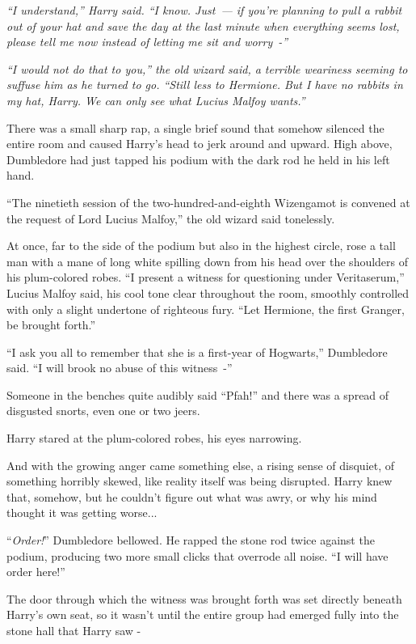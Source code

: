 \emph{``I understand,'' Harry said. ``I know. Just~--- if you're planning to pull a rabbit out of your hat and save the day at the last minute when everything seems lost, please tell me now instead of letting me sit and worry~-''}

\emph{``I would not do that to you,'' the old wizard said, a terrible weariness seeming to suffuse him as he turned to go. ``Still less to Hermione. But I have no rabbits in my hat, Harry. We can only see what Lucius Malfoy wants.''}

There was a small sharp rap, a single brief sound that somehow silenced the entire room and caused Harry's head to jerk around and upward. High above, Dumbledore had just tapped his podium with the dark rod he held in his left hand.

``The ninetieth session of the two-hundred-and-eighth Wizengamot is convened at the request of Lord Lucius Malfoy,'' the old wizard said tonelessly.

At once, far to the side of the podium but also in the highest circle, rose a tall man with a mane of long white spilling down from his head over the shoulders of his plum-colored robes. ``I present a witness for questioning under Veritaserum,'' Lucius Malfoy said, his cool tone clear throughout the room, smoothly controlled with only a slight undertone of righteous fury. ``Let Hermione, the first Granger, be brought forth.''

``I ask you all to remember that she is a first-year of Hogwarts,'' Dumbledore said. ``I will brook no abuse of this witness~-''

Someone in the benches quite audibly said ``Pfah!'' and there was a spread of disgusted snorts, even one or two jeers.

Harry stared at the plum-colored robes, his eyes narrowing.

And with the growing anger came something else, a rising sense of disquiet, of something horribly skewed, like reality itself was being disrupted. Harry knew that, somehow, but he couldn't figure out what was awry, or why his mind thought it was getting worse...

``\emph{Order!}'' Dumbledore bellowed. He rapped the stone rod twice against the podium, producing two more small clicks that overrode all noise. ``I will have order here!''

The door through which the witness was brought forth was set directly beneath Harry's own seat, so it wasn't until the entire group had emerged fully into the stone hall that Harry saw -

